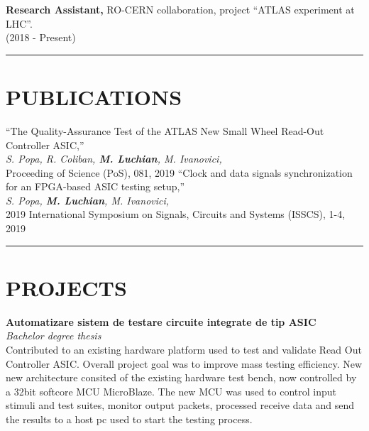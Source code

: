 \documentclass{resume}
\begin{document}
\begin{resume}
    {\bf Research Assistant,}
    RO-CERN collaboration, project ``ATLAS experiment at LHC''.\\
    (2018 - Present)

\noindent\rule{\textwidth}{0.4pt}
\section{PUBLICATIONS} 
\vspace{0.1in}

``The Quality-Assurance Test of the ATLAS New Small Wheel Read-Out Controller ASIC,''\\
{\it S. Popa, R. Coliban, {\bf M. Luchian}, M. Ivanovici,}\\
Proceeding of Science (PoS), 081, 2019
``Clock and data signals synchronization for an FPGA-based ASIC testing setup,''\\ 
{\it S. Popa, {\bf M. Luchian}, M. Ivanovici,}\\ 
2019 International Symposium on Signals, Circuits and Systems (ISSCS), 1-4, 2019\\
\noindent\rule{\textwidth}{0.4pt}
\section{PROJECTS} 
\vspace{0.1in} 
   
    {\bf Automatizare sistem de testare circuite integrate de tip ASIC}\\
    {\it Bachelor degree thesis} \\
    Contributed to an existing hardware platform used to test and validate Read Out Controller ASIC.
    Overall project goal was to improve mass testing efficiency. New new architecture consited of the existing 
    hardware test bench, now controlled by a 32bit softcore MCU MicroBlaze. The new MCU was used to control input stimuli and
    test suites, monitor output packets, processed receive data and send the results to a host pc used to start the testing process.


\end{resume}
\end{document}
